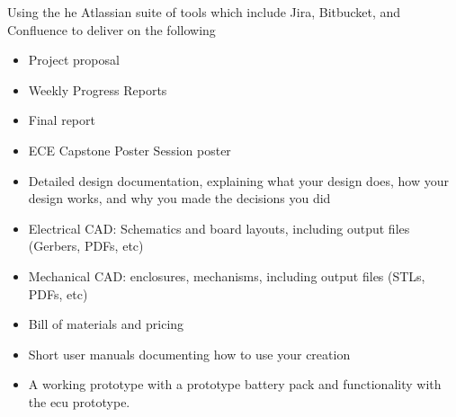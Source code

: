 \begin{enumerate}
	Using the he Atlassian suite of tools which include Jira, Bitbucket, and Confluence to deliver on the following
	
	\begin{itemize}
		\item Project proposal
		\item Weekly Progress Reports
		\item Final report
		\item ECE Capstone Poster Session poster
		\item Detailed design documentation, explaining what your design does, how your design works, and why you made the decisions you did
		\item Electrical CAD: Schematics and board layouts, including output files (Gerbers, PDFs, etc)
		\item Mechanical CAD: enclosures, mechanisms, including output files (STLs, PDFs, etc)
		\item Bill of materials and pricing
		\item Short user manuals documenting how to use your creation
		\item A working prototype with a prototype battery pack and functionality with the \gls{ecu} prototype.
	\end{itemize}
\end{enumerate}